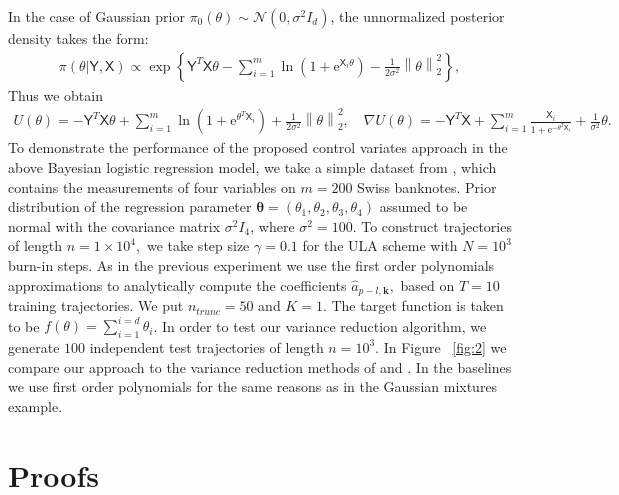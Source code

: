 \documentclass[bj]{imsart}
\def\rme{\mathrm{e}}
\begin{document}
In the case of  Gaussian prior $\pi_0(\theta) \sim \mathcal{N}(0,\sigma^2 I_d)$, the unnormalized posterior density takes the form:
\begin{eqnarray*}
\pi(\theta | \mathsf{Y}, \mathsf{X}) \propto \exp \left\{ \mathsf{Y}^T \mathsf{X} \theta - \sum\limits_{i=1}^m \ln{\left(1 + \rme^{\mathsf{X}_i \theta}\right)} - \frac{1}{2\sigma^2} \left\|\theta\right\|_2^2 \right\},
\end{eqnarray*}
Thus we obtain
\begin{eqnarray*}
U(\theta) = -\mathsf{Y}^T \mathsf{X} \theta + \sum_{i=1}^m \ln{\left(1 + \rme^{\theta^T \mathsf{X}_i}\right)} + \frac{1}{2\sigma^2} \left\| \theta\right\|_2^2, \quad
\nabla U(\theta) = -\mathsf{Y}^T \mathsf{X} + \sum_{i=1}^m \frac{\mathsf{X}_i}{1 + \rme^{-\mathsf{\theta}^T \mathsf{X}_i}} + \frac{1}{\sigma^2} \theta.
\end{eqnarray*}
To demonstrate the performance of the proposed control variates approach in the above Bayesian logistic regression model, we take a simple dataset from \cite{mira2013zero}, which contains the measurements of four variables on $m=200$ Swiss banknotes. Prior distribution of the regression parameter $\mathbf{\theta} = \left( \theta_1, \theta_2, \theta_3, \theta_4 \right)$ assumed to be normal with the covariance matrix $\sigma^2 I_4$, where $\sigma^2 = 100$. To construct trajectories of length $n = 1 \times 10^4, $ we take step size $\gamma = 0.1$ for the ULA scheme with $N = 10^3$ burn-in steps. As in the previous experiment we use the first order polynomials approximations to analytically compute the coefficients $\hat{a}_{p-l,\mathbf{k}},$ based on $T = 10$ training trajectories. We put $n_{trunc} = 50$ and $K = 1$. The target function is taken to be $f(\theta) = \sum_{i=1}^{i=d}\theta_i$.  In order to test our variance reduction algorithm, we generate \(100\) independent test trajectories of length $n = 10^3$. In Figure ~\ref{fig:2} we compare our approach to the variance reduction methods of \cite{mira2013zero} and \cite{belomestny2019esvm}. In the baselines we use first order polynomials for the same reasons as in the Gaussian mixtures example.

\section{Proofs}
\label{sec:proofs}
\end{document}

